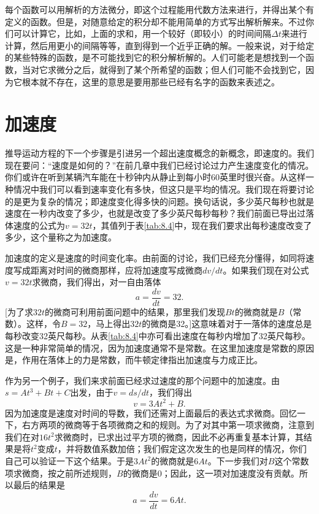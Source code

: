 每个函数可以用解析的方法微分，即这个过程能用代数方法来进行，并得出某个有定义的函数。但是，对随意给定的积分却不能用简单的方式写出解析解来。不过你们可以计算它，比如，上面的求和，用一个较好（即较小）的时间间隔$\Delta t$来进行计算，然后用更小的间隔等等，直到得到一个近乎正确的解。一般来说，对于给定的某些特殊的函数，是不可能找到它的积分解析解的。人们可能老是想找到一个函数，当对它求微分之后，就得到了某个所希望的函数；但人们可能不会找到它，因为它根本就不存在，这里的意思是要用那些已经有名字的函数来表述之。




\section{加速度}

推导运动方程的下一个步骤是引进另一个超出速度概念的新概念，即速度的。我们现在要问：“速度是如何的？”在前几章中我们已经讨论过力产生速度变化的情况。你们或许在听到某辆汽车能在十秒钟内从静止到每小时60英里时很兴奋。从这样一种情况中我们可以看到速率变化有多快，但这只是平均的情况。我们现在将要讨论的是更为复杂的情况；即速度变化得多快的问题。换句话说，多少英尺每秒也就是速度在一秒内改变了多少，也就是改变了多少英尺每秒每秒？我们前面已导出过落体速度的公式为$v=32t$，其值列于表\ref{tab:8.4}中，现在我们要求出每秒速度改变了多少，这个量称之为加速度。

加速度的定义是速度的时间变化率。由前面的讨论，我们已经充分懂得，如同将速度写成距离对时间的微商那样，应将加速度写成微商$dv/dt$。如果我们现在对公式$v=32t$求微商，我们得出，对一自由落体
\begin{equation}
\label{Eq:I:8:9}
a=\frac{dv}{dt}=32.
\end{equation}
[为了求$32t$的微商可利用前面问题中的结果，那里我们发现$Bt$的微商就是$B$（常数）。这样，令$B=32$，马上得出$32t$的微商是32。]这意味着对于一落体的速度总是每秒改变32英尺每秒。从表\ref{tab:8.4}中亦可看出速度在每秒内增加了32英尺每秒。这是一种非常简单的情况，因为加速度通常不是常数。在这里加速度是常数的原因是，作用在落体上的力是常数，而牛顿定律指出加速度与力成正比。

作为另一个例子，我们来求前面已经求过速度的那个问题中的加速度。由$s=At^3+Bt+C$出发，由于$v=ds/dt$，我们得出
\begin{equation*}
v=3At^2+B.
\end{equation*}
因为加速度是速度对时间的导数，我们还需对上面最后的表达式求微商。回忆一下，右方两项的微商等于各项微商之和的规则。为了对其中第一项求微商，注意到我们在对$16t^2$求微商时，已求出过平方项的微商，因此不必再重复基本计算，其结果是将$t^2$变成$t$，并将数值系数加倍；我们假定这次发生的也是同样的情况，你们自己可以验证一下这个结果。于是$3At^2$的微商就是$6At$。下一步我们对$B$这个常数项求微商，按之前所述规则，$B$的微商是0；因此，这一项对加速度没有贡献。所以最后的结果是
\begin{equation*}
a=\frac{dv}{dt}=6At.
\end{equation*}

